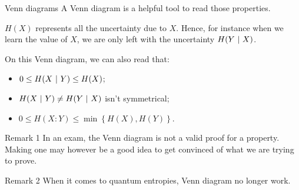 \documentclass[a4paper]{article}
\begin{document}
\begin{parag}{Venn diagrams}
    A Venn diagram is a helpful tool to read those properties.

    $H\left(X\right)$ represents all the uncertainty due to $X$. Hence, for instance when we learn the value of $X$, we are only left with the uncertainty $H\left(Y \suchthat X\right)$.

    On this Venn diagram, we can also read that:
    \begin{itemize}
        \item $0 \leq H\left(X \suchthat Y\right) \leq H\left(X\right)$;
        \item $H\left(X \suchthat Y\right) \neq H\left(Y \suchthat X\right)$ isn't symmetrical;
        \item $0 \leq H\left(X : Y\right) \leq \min\left\{H\left(X\right), H\left(Y\right)\right\}$.
    \end{itemize}

    \begin{subparag}{Remark 1}
        In an exam, the Venn diagram is not a valid proof for a property. Making one may however be a good idea to get convinced of what we are trying to prove.
    \end{subparag}

    \begin{subparag}{Remark 2}
        When it comes to quantum entropies, Venn diagram no longer work.
    \end{subparag}
\end{parag}
\end{document}
